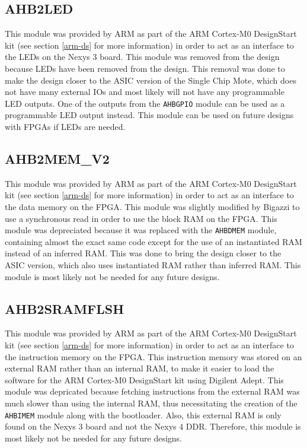 \subsection{AHB2LED}
This module was provided by ARM as part of the ARM Cortex-M0 DesignStart kit (see section \ref{arm-ds} for more information) in order to act as an interface to the LEDs on the Nexys 3 board. This module was removed from the design because LEDs have been removed from the design. This removal was done to make the design closer to the ASIC version of the Single Chip Mote, which does not have many external IOs and most likely will not have any programmable LED outputs. One of the outputs from the \texttt{AHBGPIO} module can be used as a programmable LED output instead. This module can be used on future designs with FPGAs if LEDs are needed.

\subsection{AHB2MEM\_V2}
This module was provided by ARM as part of the ARM Cortex-M0 DesignStart kit (see section \ref{arm-ds} for more information) in order to act as an interface to the data memory on the FPGA. This module was slightly modified by Bigazzi to use a synchronous read in order to use the block RAM on the FPGA. This module was depreciated because it was replaced with the \texttt{AHBDMEM} module, containing almost the exact same code except for the use of an instantiated RAM instead of an inferred RAM. This was done to bring the design closer to the ASIC version, which also uses instantiated RAM rather than inferred RAM. This module is most likely not be needed for any future designs.

\subsection{AHB2SRAMFLSH}
This module was provided by ARM as part of the ARM Cortex-M0 DesignStart kit (see section \ref{arm-ds} for more information) in order to act as an interface to the instruction memory on the FPGA. This instruction memory was stored on an external RAM rather than an internal RAM, to make it easier to load the software for the ARM Cortex-M0 DesignStart kit using Digilent Adept. This module was depricated because fetching instructions from the external RAM was much slower than using the internal RAM, thus necessitating the creation of the \texttt{AHBIMEM} module along with the bootloader. Also, this external RAM is only found on the Nexys 3 board and not the Nexys 4 DDR. Therefore, this module is most likely not be needed for any future designs.

